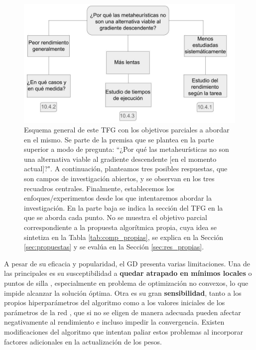 \begin{figure}[H]
    \centering
    \includegraphics[width=0.9\linewidth]{Plantilla_TFG_latex//imagenes//Inf//Int/fig.jpg}
    \caption[Esquema general de la parte Informática de este TFG con los objetivos parciales a abordar en el mismo]{Esquema general de este TFG con los objetivos parciales a abordar en el mismo. Se parte de la premisa que se plantea en la parte superior a modo de pregunta: ``¿Por qué las metaheurísticas no son una alternativa viable al gradiente descendente [en el momento actual]?". A continuación, planteamos tres posibles respuestas, que son campos de investigación abiertos, y se observan en los tres recuadros centrales. Finalmente, establecemos los enfoques/experimentos desde los que intentaremos abordar la investigación. En la parte baja se indica la sección del TFG en la que se aborda cada punto. No se muestra el objetivo parcial correspondiente a la propuesta algorítmica propia, cuya idea se sintetiza en la Tabla \ref{tab:comp_propias}, se explica en la Sección \ref{sec:propuestas} y se evalúa en la Sección \ref{sec:res_propias}.}
    \label{fig:esquema}
\end{figure}


A pesar de su eficacia y popularidad, el GD presenta varias limitaciones. Una de las principales es su susceptibilidad a \textbf{quedar atrapado en mínimos locales} o puntos de silla \cite{NIPS2014_17e23e50}, especialmente en problema de optimización no convexos, lo que impide alcanzar la solución óptima. Otra es su gran \textbf{sensibilidad}, tanto a los propios hiperparámetros del algoritmo como a los valores iniciales de los parámetros de la red \cite{stabilityProblem2}, que si no se eligen de manera adecuada pueden afectar negativamente al rendimiento e incluso impedir la convergencia. Existen modificaciones del algoritmo que intentan paliar estos problemas al incorporar factores adicionales en la actualización de los pesos.

